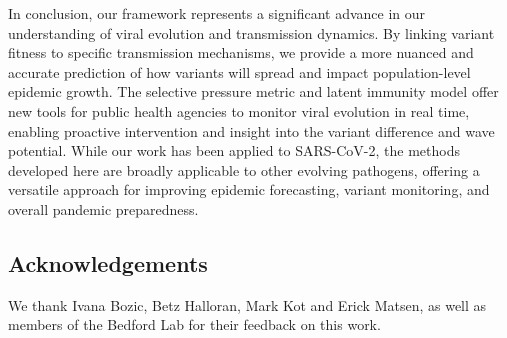 \documentclass[11pt,oneside,letterpaper]{article}
\begin{document}
%


In conclusion, our framework represents a significant advance in our understanding of viral evolution and transmission dynamics.
By linking variant fitness to specific transmission mechanisms, we provide a more nuanced and accurate prediction of how variants will spread and impact population-level epidemic growth.
The selective pressure metric and latent immunity model offer new tools for public health agencies to monitor viral evolution in real time, enabling proactive intervention and insight into the variant difference and wave potential.
While our work has been applied to SARS-CoV-2, the methods developed here are broadly applicable to other evolving pathogens, offering a versatile approach for improving epidemic forecasting, variant monitoring, and overall pandemic preparedness.

\subsection*{Acknowledgements}

We thank Ivana Bozic, Betz Halloran, Mark Kot and Erick Matsen, as well as members of the Bedford Lab for their feedback on this work.
\end{document}

